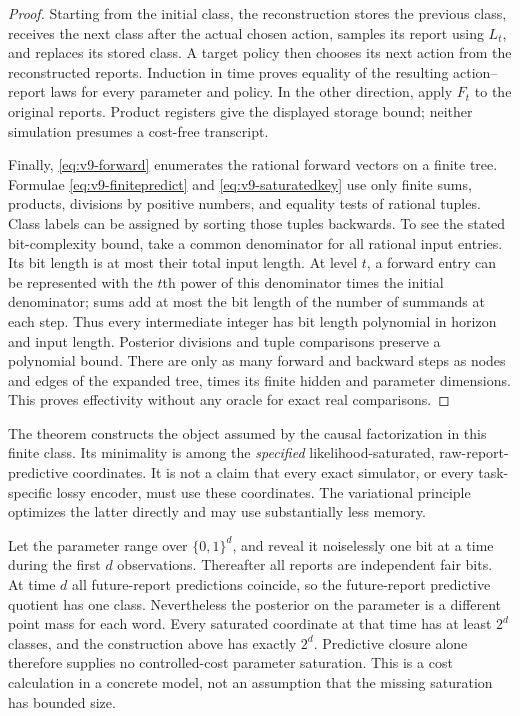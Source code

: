 \begin{proof}
Starting from the initial class, the reconstruction stores the previous
class, receives the next class after the actual chosen action, samples
its report using $L_t$, and replaces its stored class. A target policy
then chooses its next action from the reconstructed reports. Induction
in time proves equality of the resulting action--report laws for every
parameter and policy. In the other direction, apply $F_t$ to the original
reports. Product registers give the displayed storage bound; neither
simulation presumes a cost-free transcript.

Finally, \eqref{eq:v9-forward} enumerates the rational forward vectors
on a finite tree. Formulae \eqref{eq:v9-finitepredict} and
\eqref{eq:v9-saturatedkey} use only finite sums, products, divisions by
positive numbers, and equality tests of rational tuples. Class labels
can be assigned by sorting those tuples backwards. To see the stated
bit-complexity bound, take a common denominator for all rational input
entries. Its bit length is at most their total input length. At level
$t$, a forward entry can be represented with the $t$th power of this
denominator times the initial denominator; sums add at most the bit
length of the number of summands at each step. Thus every intermediate
integer has bit length polynomial in horizon and input length.
Posterior divisions and tuple comparisons preserve a polynomial bound.
There are only as many forward and backward steps as nodes and edges
of the expanded tree, times its finite hidden and parameter dimensions.
This proves effectivity without any oracle for exact real comparisons.
\end{proof}

The theorem constructs the object assumed by the causal factorization
in this finite class. Its minimality is among the \emph{specified}
likelihood-saturated, raw-report-predictive coordinates. It is not a claim
that every exact simulator, or every task-specific lossy encoder, must
use these coordinates. The variational principle optimizes the latter
directly and may use substantially less memory.

\begin{example}
\label{ex:v9-saturationcost}
Let the parameter range over $\{0,1\}^d$, and reveal it noiselessly one
bit at a time during the first $d$ observations. Thereafter all reports
are independent fair bits. At time $d$ all future-report predictions
coincide, so the future-report predictive quotient has one class.
Nevertheless the posterior on the parameter is a different point mass
for each word. Every saturated coordinate at that time has at least
$2^d$ classes, and the construction above has exactly $2^d$.
Predictive closure alone therefore supplies no controlled-cost
parameter saturation. This is a cost calculation in a concrete model,
not an assumption that the missing saturation has bounded size.
\end{example}

